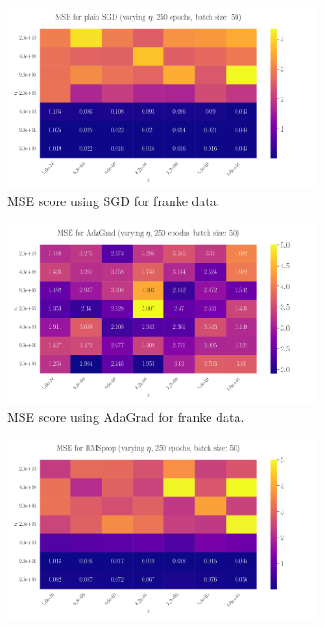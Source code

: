 \documentclass[%
reprint,s
amsmath,amssymb,
aps,
]{revtex4-2}
\begin{document}
\begin{figure}
	\begin{subfigure}{0.41\textwidth}
		\includegraphics[width=\textwidth]{Figures/LinRegPlainSGD_250epochs_batchS50.pdf}
		\caption{MSE score using SGD for franke data.}
		\label{fig:LinReg25x25_epoch250_bacthS50_SGD}
	\end{subfigure}
	\hfill
	\begin{subfigure}{0.41\textwidth}
		\includegraphics[width=\textwidth]{Figures/LinRegAdaGrad_250epochs_batchS50.pdf}
		\caption{MSE score using AdaGrad for franke data.}
		\label{fig:LinReg25x25_epoch250_bacthS50_AdaGrad}
	\end{subfigure}
\hfill\newline
	\begin{subfigure}{0.41\textwidth}
		\includegraphics[width=\textwidth]{Figures/LinRegRMSprop_250epochs_batchS50.pdf}

\end{subfigure}
\end{figure}
\end{document}
